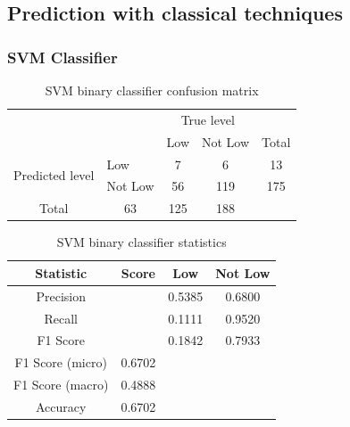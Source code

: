 \documentclass[12pt, a4paper]{article}
\begin{document}
\subsection{Prediction with classical techniques}

\subsubsection{SVM Classifier}

\begin{table}[ht]
\centering
\begin{tabular}{l|l|c|c|c}
\multicolumn{2}{c}{}&\multicolumn{2}{c}{True level}&\\
\cline{3-4}
\multicolumn{2}{c|}{}&Low&Not Low&\multicolumn{1}{c}{Total}\\
\cline{2-4}
\multirow{2}{*}{Predicted level}& Low & 7 & 6 & 13\\
\cline{2-4}
& Not Low & 56 & 119 & 175\\
\cline{2-4}
\multicolumn{1}{c}{Total} & \multicolumn{1}{c}{63} & \multicolumn{    1}{c}{125} & \multicolumn{1}{c}{188}\\
\end{tabular}
\caption{SVM binary classifier confusion matrix}
\label{table:svmcm_low}
\end{table}

\begin{table}[ht]
\centering
\begin{tabular}{||c c c c||} 
 \hline
 Statistic & Score & Low & Not Low  \\ [0.5ex] 
 \hline\hline
 Precision &  & 0.5385 & 0.6800 \\ 
 Recall & & 0.1111 & 0.9520 \\
 F1 Score &  & 0.1842 & 0.7933 \\
 F1 Score (micro) & 0.6702 & & \\
 F1 Score (macro)  & 0.4888 & &  \\ 
 Accuracy  & 0.6702 & & \\ [1ex] 
 \hline
\end{tabular}
\caption{SVM binary classifier statistics}
\label{table:svmstat_low}
\end{table}
\end{document}
